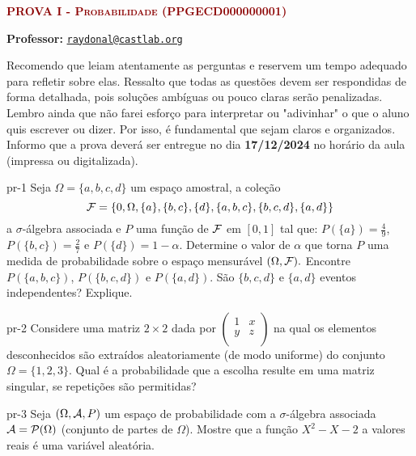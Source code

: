 




% 


{\scshape\bf\textcolor{darkred}{PROVA I - Probabilidade (PPGECD000000001)}}


\textsf{\textbf{Professor:}}    \href{mailto:raydonal@castlab.org}{\texttt{raydonal@castlab.org}}

\bigskip 
\begin{regras}
Recomendo que leiam atentamente as perguntas e reservem um tempo adequado para refletir sobre elas. Ressalto que todas as questões devem ser respondidas de forma detalhada, pois soluções ambíguas ou pouco claras serão penalizadas. Lembro ainda que não farei esforço para interpretar ou "adivinhar" o que o aluno quis escrever ou dizer. Por isso, é fundamental que sejam claros e organizados. Informo que a prova deverá ser entregue no dia {\bf 17/12/2024} no horário da aula (impressa ou digitalizada).
\end{regras}
\vspace{2ex}


\begin{problema}{}{pr-1}
Seja $\Omega = \{a, b, c, d\}$  um espaço amostral, a coleção $${\cal F} =  \{0, \Omega, \{a\}, \{b, c\}, \{d\}, \{a, b, c\}, \{b, c, d\},\{a, d\}\}$$ a $\sigma$-álgebra associada e $P$ uma função de ${\cal F}$ em $[0,1]$ tal que: $P(\{a\}) = \frac{4}{9}$, $P(\{b, c\}) = \frac{2}{7} $ e $ P(\{d\}) =1- \alpha.$ Determine o valor de $\alpha$ que torna $P$ uma medida de probabilidade sobre o espaço mensurável $(\Omega, {\cal F}).$ Encontre $P(\{a,b,c\})$, $P(\{b,c,d\})$ e $P(\{a,d\})$. São $\{b,c,d\}$ e $\{a,d\}$ eventos independentes? Explique.
\end{problema}



\begin{problema}{}{pr-2}
Considere uma matriz $2 \times 2$ dada por 
$\begin{pmatrix}
	1 & x \\
	y & z \\
\end{pmatrix}$ 
na qual os elementos desconhecidos são extraídos aleatoriamente (de modo uniforme) do conjunto $\Omega=\{1,2,3\}$. Qual é a probabilidade que a escolha resulte em uma matriz singular, se repetições são permitidas?
\end{problema}


\begin{problema}{}{pr-3}
	Seja  $(\Omega, {\cal A}, P)$ um espaço de probabilidade com a $\sigma$-álgebra associada ${\cal A} = {\cal P}(\Omega)$ (conjunto de partes de $\Omega$). Mostre que a função $X^2-X-2$ a
	valores reais é uma variável aleatória.
\end{problema}


